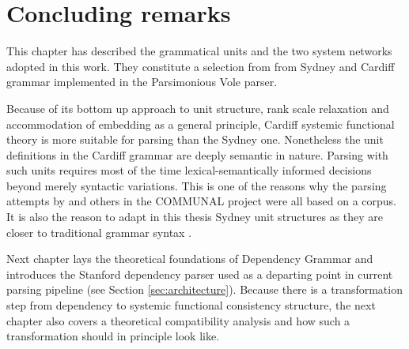 \section{Concluding remarks}
This chapter has described the grammatical units and the two system networks adopted in this work. They constitute a selection from from Sydney and Cardiff grammar implemented in the Parsimonious Vole parser.

Because of its bottom up approach to unit structure, rank scale relaxation and accommodation of embedding as a general principle, Cardiff systemic functional theory is more suitable for parsing than the Sydney one. Nonetheless the unit definitions in the Cardiff grammar are deeply semantic in nature. Parsing with such units requires most of the time lexical-semantically informed decisions beyond merely syntactic variations. This is one of the reasons why the parsing attempts by \citet{ODonoghue1991a} and others in the COMMUNAL project were all based on a corpus. It is also the reason to adapt in this thesis Sydney unit structures as they are closer to traditional grammar syntax \citep{Quirk1985}.

Next chapter lays the theoretical foundations of Dependency Grammar and introduces the Stanford dependency parser used as a departing point in current parsing pipeline (see Section \ref{sec:architecture}). Because there is a transformation step from dependency to systemic functional consistency structure, the next chapter also covers a theoretical compatibility analysis and how such a transformation should in principle look like. 

